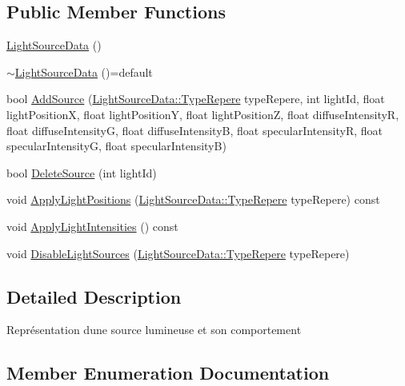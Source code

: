 \subsection*{Public Member Functions}
\begin{DoxyCompactItemize}
\item 
\mbox{\hyperlink{classLightSourceData_a0862cd4423045f379a724594f5a7f7f2}{Light\+Source\+Data}} ()
\item 
\mbox{\hyperlink{classLightSourceData_a6b7b1d0213c0aa6eccf9a521794aca9f}{$\sim$\+Light\+Source\+Data}} ()=default
\item 
bool \mbox{\hyperlink{classLightSourceData_a29ba01a39c4a04d379bc3b437faae198}{Add\+Source}} (\mbox{\hyperlink{classLightSourceData_abdbcb37900b8147487551a3afcdd90f5}{Light\+Source\+Data\+::\+Type\+Repere}} type\+Repere, int light\+Id, float light\+PositionX, float light\+PositionY, float light\+PositionZ, float diffuse\+IntensityR, float diffuse\+IntensityG, float diffuse\+IntensityB, float specular\+IntensityR, float specular\+IntensityG, float specular\+IntensityB)
\item 
bool \mbox{\hyperlink{classLightSourceData_a586f688bed495b5e65c44a7abb3a4aa5}{Delete\+Source}} (int light\+Id)
\item 
void \mbox{\hyperlink{classLightSourceData_a2a6123eb077ef75ade0448bf3273d9e3}{Apply\+Light\+Positions}} (\mbox{\hyperlink{classLightSourceData_abdbcb37900b8147487551a3afcdd90f5}{Light\+Source\+Data\+::\+Type\+Repere}} type\+Repere) const
\item 
void \mbox{\hyperlink{classLightSourceData_af5a955ec2f37cf81c74b370586afe3a8}{Apply\+Light\+Intensities}} () const
\item 
void \mbox{\hyperlink{classLightSourceData_a2601aa99b5f29d10f9e89afb5a4cd300}{Disable\+Light\+Sources}} (\mbox{\hyperlink{classLightSourceData_abdbcb37900b8147487551a3afcdd90f5}{Light\+Source\+Data\+::\+Type\+Repere}} type\+Repere)
\end{DoxyCompactItemize}


\subsection{Detailed Description}
Représentation d\textquotesingle{}une source lumineuse et son comportement 

\subsection{Member Enumeration Documentation}
\mbox{\label{classLightSourceData_abdbcb37900b8147487551a3afcdd90f5}} 

